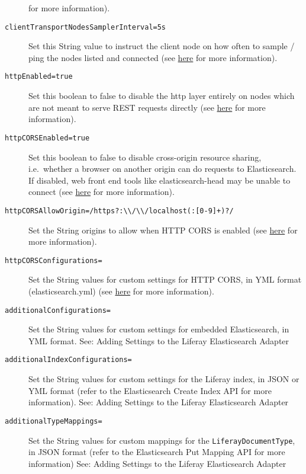 \begin{description}
for more information).
\item[\texttt{clientTransportNodesSamplerInterval=5s}]
Set this String value to instruct the client node on how often to sample
/ ping the nodes listed and connected (see
\href{https://www.elastic.co/guide/en/elasticsearch/client/java-api/2.2/transport-client.html}{here}
for more information).
\item[\texttt{httpEnabled=true}]
Set this boolean to false to disable the http layer entirely on nodes
which are not meant to serve REST requests directly (see
\href{https://www.elastic.co/guide/en/elasticsearch/reference/2.2/modules-http.html\#_disable_http}{here}
for more information).
\item[\texttt{httpCORSEnabled=true}]
Set this boolean to false to disable cross-origin resource sharing,
i.e.~whether a browser on another origin can do requests to
Elasticsearch. If disabled, web front end tools like elasticsearch-head
may be unable to connect (see
\href{https://www.elastic.co/guide/en/elasticsearch/reference/2.2/modules-http.html\#_settings_2}{here}
for more information).
\item[\texttt{httpCORSAllowOrigin=/https?:\textbackslash{}\textbackslash{}/\textbackslash{}\textbackslash{}/localhost(:{[}0-9{]}+)?/}]
Set the String origins to allow when HTTP CORS is enabled (see
\href{https://www.elastic.co/guide/en/elasticsearch/reference/2.2/modules-http.html\#_settings_2}{here}
for more information).
\item[\texttt{httpCORSConfigurations=}]
Set the String values for custom settings for HTTP CORS, in YML format
(elasticsearch.yml) (see
\href{https://www.elastic.co/guide/en/elasticsearch/reference/2.2/modules-http.html\#_settings_2}{here}
for more information).
\item[\texttt{additionalConfigurations=}]
Set the String values for custom settings for embedded Elasticsearch, in
YML format. See: Adding Settings to the Liferay Elasticsearch Adapter
\item[\texttt{additionalIndexConfigurations=}]
Set the String values for custom settings for the Liferay index, in JSON
or YML format (refer to the Elasticsearch Create Index API for more
information). See: Adding Settings to the Liferay Elasticsearch Adapter
\item[\texttt{additionalTypeMappings=}]
Set the String values for custom mappings for the
\texttt{LiferayDocumentType}, in JSON format (refer to the Elasticsearch
Put Mapping API for more information) See: Adding Settings to the
Liferay Elasticsearch Adapter
\end{description}

